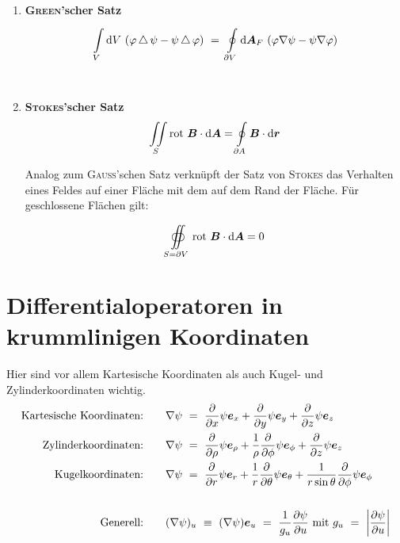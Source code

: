 \begin{enumerate}
\ \\
\item \textbf{\textsc{Green}'scher Satz}\\

\begin{equation*}
\int\limits_{{V}}^{{}}\mathrm{d}{V}\ (\varphi\mathop{{}\bigtriangleup}\nolimits\psi-\psi\mathop{{}\bigtriangleup}\nolimits\varphi) \ = \ \oint\limits_{{\partial V}}^{{}}\mathrm{d}{\bm{A}_F}\ (\varphi\nabla\psi-\psi\nabla\varphi)
\end{equation*}

\ \\
\item \textbf{\textsc{Stokes}'scher Satz}\\

\begin{equation*}
\iint\limits_S\text{rot }\bm{B}\cdot\mathrm{d}\bm{A}=\oint\limits_{\partial A}\bm{B}\cdot\mathrm{d}\bm{r}
\end{equation*}

Analog zum \textsc{Gauss}'schen Satz verknüpft der Satz von \textsc{Stokes} das Verhalten eines Feldes auf einer Fläche mit dem auf dem Rand der Fläche. Für geschlossene Flächen gilt:

\begin{equation*}
\oiint\limits_{S=\partial V}\text{rot }\bm{B}\cdot\mathrm{d}\bm{A}=0
\end{equation*}
\end{enumerate}

\section{Differentialoperatoren in krummlinigen Koordinaten}

Hier sind vor allem Kartesische Koordinaten als auch Kugel- und Zylinderkoordinaten wichtig.\\

\begin{align*}
\text{Kartesische Koordinaten:}\qquad &\nabla\psi \ = \ \pdiff{}{x}\psi\vec{e}_x + \pdiff{}{y}\psi\vec{e}_y + \pdiff{}{z}\psi\vec{e}_z\\
\text{Zylinderkoordinaten:}\qquad &\nabla\psi \ = \ \pdiff{}{\rho}\psi\vec{e}_\rho + \frac{1}{\rho}\pdiff{}{\phi}\psi\vec{e}_\phi + \pdiff{}{z}\psi\vec{e}_z\\
\text{Kugelkoordinaten:} \qquad &\nabla\psi \ = \ \pdiff{}{r}\psi\vec{e}_r+\frac{1}{r}\pdiff{}{\theta}\psi\vec{e}_\theta+\frac{1}{r\sin\theta}\pdiff{}{\phi}\psi\vec{e}_\phi\\
\\
\text{Generell:}\qquad &(\nabla\psi)_u \ \equiv \ (\nabla\psi)\vec{e}_u \ = \ \frac{1}{g_u}\pdiff{\psi}{u} \text{ mit } g_u \ = \ \left|\pdiff{\psi}{u}\right|
\end{align*}


